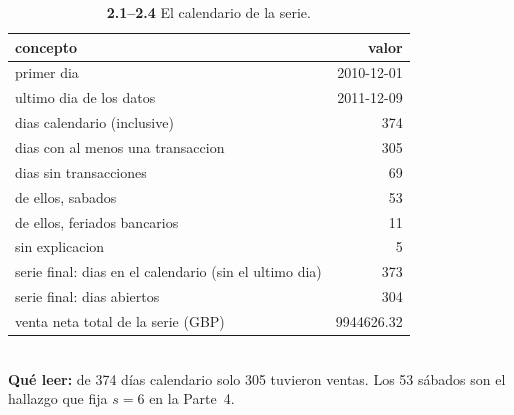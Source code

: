 \begin{table}[htbp]
\centering
\footnotesize
\caption{\textbf{2.1--2.4} El calendario de la serie.}
\label{tab:p2_resumen_calendario}
\begin{tabular}{lr}
\toprule
\textbf{concepto} & \textbf{valor} \\
\midrule
primer dia & 2010-12-01 \\
ultimo dia de los datos & 2011-12-09 \\
dias calendario (inclusive) & 374 \\
dias con al menos una transaccion & 305 \\
dias sin transacciones & 69 \\
   de ellos, sabados & 53 \\
   de ellos, feriados bancarios & 11 \\
   sin explicacion & 5 \\
serie final: dias en el calendario (sin el ultimo dia) & 373 \\
serie final: dias abiertos & 304 \\
venta neta total de la serie (GBP) & 9944626.32 \\
\bottomrule
\end{tabular}
\\[0.3em]{\scriptsize \textbf{Qu\'e leer:} de 374 d\'ias calendario solo 305 tuvieron ventas. Los 53 s\'abados son el hallazgo que fija $s=6$ en la Parte~4.}
\end{table}

